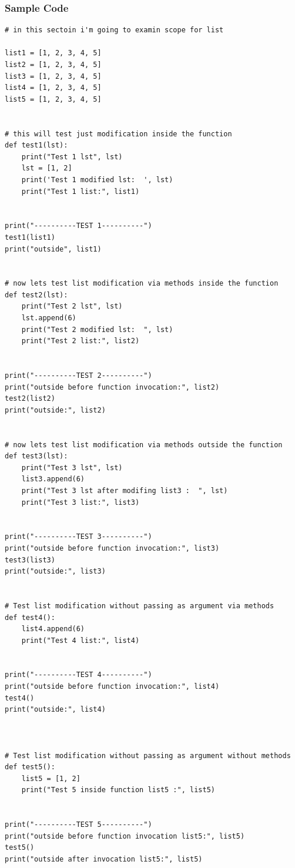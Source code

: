 \documentclass[11pt]{article}
\begin{document}
\subsubsection{Sample Code}
\label{sec:orgb4d5e18}

\begin{verbatim}
# in this sectoin i'm going to examin scope for list

list1 = [1, 2, 3, 4, 5]
list2 = [1, 2, 3, 4, 5]
list3 = [1, 2, 3, 4, 5]
list4 = [1, 2, 3, 4, 5]
list5 = [1, 2, 3, 4, 5]


# this will test just modification inside the function
def test1(lst):
    print("Test 1 lst", lst)
    lst = [1, 2]
    print('Test 1 modified lst:  ', lst)
    print("Test 1 list:", list1)


print("----------TEST 1----------")
test1(list1)
print("outside", list1)


# now lets test list modification via methods inside the function
def test2(lst):
    print("Test 2 lst", lst)
    lst.append(6)
    print("Test 2 modified lst:  ", lst)
    print("Test 2 list:", list2)


print("----------TEST 2----------")
print("outside before function invocation:", list2)
test2(list2)
print("outside:", list2)


# now lets test list modification via methods outside the function
def test3(lst):
    print("Test 3 lst", lst)
    list3.append(6)
    print("Test 3 lst after modifing list3 :  ", lst)
    print("Test 3 list:", list3)


print("----------TEST 3----------")
print("outside before function invocation:", list3)
test3(list3)
print("outside:", list3)


# Test list modification without passing as argument via methods
def test4():
    list4.append(6)
    print("Test 4 list:", list4)


print("----------TEST 4----------")
print("outside before function invocation:", list4)
test4()
print("outside:", list4)



# Test list modification without passing as argument without methods
def test5():
    list5 = [1, 2]
    print("Test 5 inside function list5 :", list5)


print("----------TEST 5----------")
print("outside before function invocation list5:", list5)
test5()
print("outside after invocation list5:", list5)


\end{verbatim}
\end{document}

